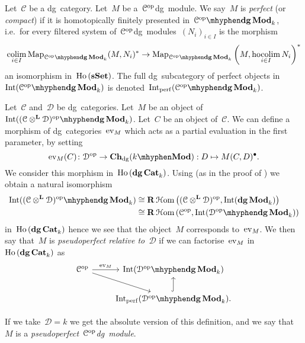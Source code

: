 \begin{refsection}
\begin{definition}
  Let~$\mathcal{C}$ be a dg~category. Let~$M$ be a~$\mathcal{C}^{\mathrm{op}}$\dash dg~module. We say~$M$ is \emph{perfect} (or \emph{compact}) if it is homotopically finitely presented in~$\dgMod{\mathcal{C}^\opp}_k$, i.e.\ for every filtered system of~$\mathcal{C}^{\mathrm{op}}$\dash dg~modules~$(N_i)_{i\in I}$ is the morphism
  \begin{equation}
    \colim_{i\in I}\Map_{\dgMod{\mathcal{C}^\opp}_k}(M,N_i)^*\to\Map_{\dgMod{\mathcal{C}^\opp}_k}\left( M,\hocolim_{i\in I}N_i \right)^*
  \end{equation}
  an isomorphism in~$\operatorname{\mathrm{Ho} \,}(\mathbf{s\,\!\mathbf{Set}})$. The full dg~subcategory of perfect objects in~$\Int(\dgMod{\mathcal{C}^\opp}_k)$ is denoted~$\Int_\perf(\dgMod{\mathcal{C}^\opp}_k)$.
\end{definition}
\begin{definition}
  Let~$\mathcal{C}$ and~$\mathcal{D}$ be dg~categories. Let~$M$ be an object of~$\Int(\dgMod{(\mathcal{C}\otimes^{\mathbf{L}}\mathcal{D})^\opp}_k)$. Let~$C$ be an object of~$\mathcal{C}$. We can define a morphism of dg~categories~$\operatorname{ev}_M$ which acts as a partial evaluation in the first parameter, by setting
  \begin{equation}
    \ev_M(C)\colon\mathcal{D}^\opp\to\Ch_\dg(k\mhyphen\Mod):D\mapsto M(C,D)^\bullet.
  \end{equation}
  We consider this morphism in~$\operatorname{\mathrm{Ho} \,}(\mathbf{dg\,Cat}_k)$. Using \cite[theorem 6.1]{toen-homotopy-theory-of-dg-categories} (as in the proof of \cite[corollary 7.6]{toen-homotopy-theory-of-dg-categories}) we obtain a natural isomorphism
  \begin{equation}
    \begin{aligned}
      \Int(\dgMod{(\mathcal{C}\otimes^{\mathbf{L}}\mathcal{D})^\opp}_k)&\cong\RRRHHom\left( (\mathcal{C}\otimes^{\mathbf{L}}\mathcal{D})^\opp,\Int(\dgMod_k) \right) \\
      &\cong\RRRHHom\left( \mathcal{C}^\opp,\Int(\dgMod{\mathcal{D}^\opp}_k) \right)
    \end{aligned}
  \end{equation}
  in~$\operatorname{\mathrm{Ho} \,}(\mathbf{dg\,Cat}_k)$ hence we see that the object~$M$ corresponds to~$\operatorname{ev}_M$. We then say that~$M$ is \emph{pseudoperfect relative to~$\mathcal{D}$} if we can factorise~$\operatorname{ev}_M$ in~$\operatorname{\mathrm{Ho} \,}(\mathbf{dg\,Cat}_k)$ as
  \begin{equation}
    \begin{tikzcd}
      \mathcal{C}^\opp \arrow{r}{\ev_M} \arrow{rd} & \Int(\dgMod{\mathcal{D}^\opp}_k) \\
      & \Int_\perf(\dgMod{\mathcal{D}^\opp}_k) \arrow[hook]{u}.
    \end{tikzcd}
  \end{equation}
\end{definition}
If we take~$\mathcal{D}=k$ we get the absolute version of this definition, and we say that $M$ is a \emph{pseudoperfect~$\mathcal{C}^{\mathrm{op}}$\dash dg~module}.


\end{refsection}
